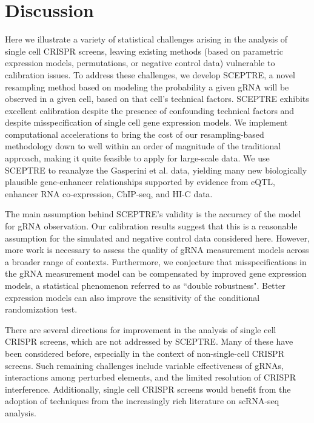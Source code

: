 \documentclass{nature}
\begin{document}
\clearpage

\restoregeometry


\section*{Discussion}

Here we illustrate a variety of statistical challenges arising in the analysis of single cell CRISPR screens, leaving existing methods (based on parametric expression models, permutations, or negative control data) vulnerable to calibration issues. To address these challenges, we develop SCEPTRE, a novel resampling method based on modeling the probability a given gRNA will be observed in a given cell, based on that cell's technical factors. SCEPTRE exhibits excellent calibration despite the presence of confounding technical factors and despite misspecification of single cell gene expression models. We implement computational accelerations to bring the cost of our resampling-based methodology down to well within an order of magnitude of the traditional approach, making it quite feasible to apply for large-scale data. We use SCEPTRE to reanalyze the Gasperini et al. data, yielding many new biologically plausible gene-enhancer relationships supported by evidence from eQTL, enhancer RNA co-expression, ChIP-seq, and HI-C data. 

The main assumption behind SCEPTRE's validity is the accuracy of the model for gRNA observation. Our calibration results suggest that this is a reasonable assumption for the simulated and negative control data considered here. However, more work is necessary to assess the quality of gRNA measurement models across a broader range of contexts. Furthermore, we conjecture that misspecifications in the gRNA measurement model can be compensated by improved gene expression models, a statistical phenomenon referred to as ``double robustness"\cite{Robins2001,VanderLaan2003}. 
Better expression models can also improve the sensitivity of the conditional randomization test\cite{Katsevich2020a}.

There are several directions for improvement in the analysis of single cell CRISPR screens, which are not addressed by SCEPTRE. Many of these have been considered before, especially in the context of non-single-cell CRISPR screens. Such remaining challenges include variable effectiveness of gRNAs\cite{Li2015,Daley2018,Xie2019}, interactions among perturbed elements\cite{Xie2017,Zamanighomi2019,Norman2019}, and the limited resolution of CRISPR interference\cite{Hsu2018}. Additionally, single cell CRISPR screens would benefit from the adoption of techniques from the increasingly rich literature on scRNA-seq analysis. 
\end{document}
